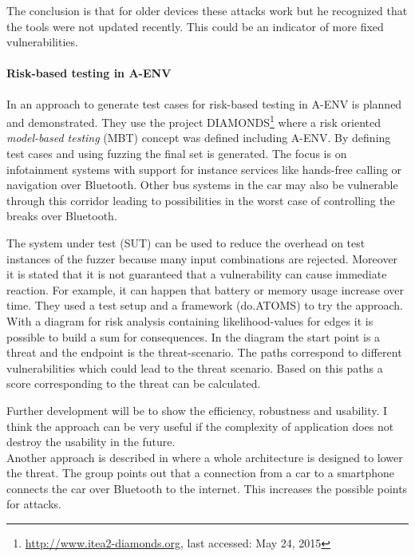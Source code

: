 \documentclass[12pt,a4paper]{article}
\begin{document}
The conclusion is that for older devices these attacks work but he recognized that the tools were not updated recently. This could be an indicator of more fixed vulnerabilities.

\paragraph{Risk-based testing in A-ENV}
In \cite{DBLP:conf/automotiveSS/JakobKSGMSF12} an approach to generate test cases for risk-based testing in A-ENV is planned and demonstrated. They use the project DIAMONDS\footnote{\url{http://www.itea2-diamonds.org}, last accessed: May 24, 2015} where a risk oriented \emph{model-based testing} (MBT) concept was defined including A-ENV. By defining test cases and using fuzzing the final set is generated. The focus is on infotainment systems with support for instance services like hands-free calling or navigation over Bluetooth. Other bus systems in the car may also be vulnerable through this corridor leading to possibilities in the worst case of controlling the breaks over Bluetooth.

The system under test (SUT) can be used to reduce the overhead on test instances of the fuzzer because many input combinations are rejected. Moreover it is stated that it is not guaranteed that a vulnerability can cause immediate reaction. For example, it can happen that battery or memory usage increase over time. They used a test setup and a framework (do.ATOMS) to try the approach. With a diagram for risk analysis containing likelihood-values for edges it is possible to build a sum for consequences. In the diagram the start point is a threat and the endpoint is the threat-scenario. The paths correspond to different vulnerabilities which could lead to the threat scenario. Based on this paths a score corresponding to the threat can be calculated. 

Further development will be to show the efficiency, robustness and usability.
I think the approach can be very useful if the complexity of application does not destroy the usability in the future.\\

Another approach is described in \cite{DBLP:journals/esl/DardanelliMTZSKH13} where a whole architecture is designed to lower the threat. The group points out that a connection from a car to a smartphone connects the car over Bluetooth to the internet. This increases the possible points for attacks.
\end{document}

